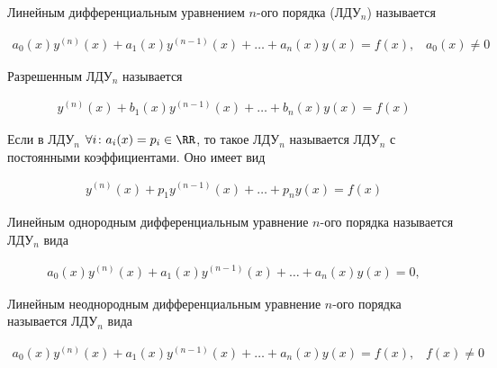 
\begin{definition}
  Линейным дифференциальным уравнением \(n\)-ого порядка (ЛДУ\(_n\)) называется

  \begin{align*}
    a_{0}(x) y^{(n)}(x) + a_{1}(x) y^{(n - 1)}(x) + \dotsc + a_{n}(x) y(x)
    = f(x), \hspace{10pt} a_{0}(x) \neq 0
  \end{align*}
\end{definition}

\begin{definition}
  Разрешенным ЛДУ\(_n\) называется

  \begin{align*}
    y^{(n)}(x) + b_{1}(x) y^{(n - 1)}(x) + \dotsc + b_{n}(x) y(x) = f(x)
  \end{align*}
\end{definition}

\begin{definition}
  Если в ЛДУ\(_n\) \(\forall i \colon a_{i}(x) = p_{i} \in \RR\),
  то такое ЛДУ\(_n\) называется ЛДУ\(_n\) с постоянными коэффициентами.
  Оно имеет вид

  \begin{align*}
    y^{(n)}(x) + p_{1} y^{(n - 1)}(x) + \dotsc + p_{n} y(x) = f(x)
  \end{align*}
\end{definition}

\begin{definition}
  Линейным однородным дифференциальным уравнение \(n\)-ого порядка называется
  ЛДУ\(_n\) вида

  \begin{align*}
    a_{0}(x) y^{(n)}(x) + a_{1}(x) y^{(n - 1)}(x) + \dotsc + a_{n}(x) y(x) = 0,
  \end{align*}
\end{definition}

\begin{definition}
  Линейным неоднородным дифференциальным уравнение \(n\)-ого порядка называется
  ЛДУ\(_n\) вида

  \begin{align*}
    a_{0}(x) y^{(n)}(x) + a_{1}(x) y^{(n - 1)}(x) + \dotsc + a_{n}(x) y(x)
    = f(x), \hspace{10pt} f(x) \neq 0
  \end{align*}
\end{definition}

